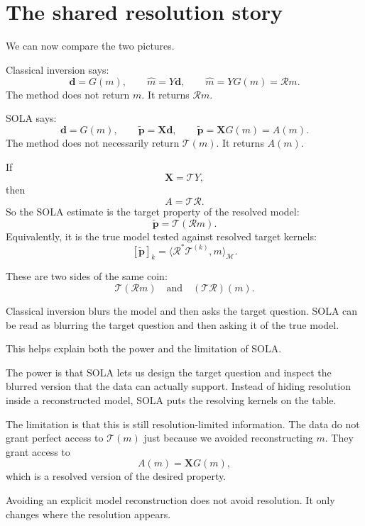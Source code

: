\documentclass[11pt,openany]{book}
\theoremstyle{definition}
\theoremstyle{remark}
\newcommand{\M}{\mathcal M}
\newcommand{\Tau}{\mathcal{T}}
\begin{document}
\section{The shared resolution story}

We can now compare the two pictures.

Classical inversion says:
\[
  \mathbf d=G(m),
  \qquad
  \hat m=Y\mathbf d,
  \qquad
  \hat m=YG(m)=\mathcal R m.
\]
The method does not return \(m\). It returns \(\mathcal R m\).

SOLA says:
\[
  \mathbf d=G(m),
  \qquad
  \widetilde{\mathbf p}=\mathbf X\mathbf d,
  \qquad
  \widetilde{\mathbf p}=\mathbf XG(m)=A(m).
\]
The method does not necessarily return \(\Tau(m)\). It returns \(A(m)\).

If
\[
  \mathbf X=\Tau Y,
\]
then
\[
  A=\Tau\mathcal R.
\]
So the SOLA estimate is the target property of the resolved model:
\[
  \widetilde{\mathbf p}
  =
  \Tau(\mathcal R m).
\]
Equivalently, it is the true model tested against resolved target kernels:
\[
  [\widetilde{\mathbf p}]_k
  =
  \langle \mathcal R^*\mathcal T^{(k)},m\rangle_{\M}.
\]

These are two sides of the same coin:
\[
  \Tau(\mathcal R m)
  \quad\text{and}\quad
  (\Tau\mathcal R)(m).
\]

\begin{intuitionbox}
Classical inversion blurs the model and then asks the target question. SOLA can be read as
blurring the target question and then asking it of the true model.
\end{intuitionbox}

This helps explain both the power and the limitation of SOLA.

The power is that SOLA lets us design the target question and inspect the blurred version that
the data can actually support. Instead of hiding resolution inside a reconstructed model, SOLA
puts the resolving kernels on the table.

The limitation is that this is still resolution-limited information. The data do not grant perfect
access to \(\Tau(m)\) just because we avoided reconstructing \(m\). They grant access to
\[
  A(m)=\mathbf XG(m),
\]
which is a resolved version of the desired property.

\begin{warningbox}
Avoiding an explicit model reconstruction does not avoid resolution. It only changes where the
resolution appears.
\end{warningbox}
\end{document}
